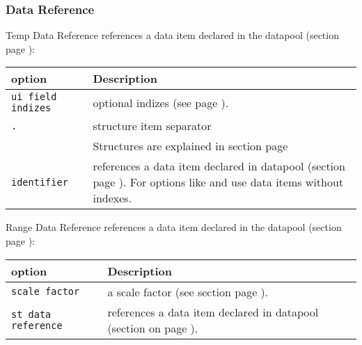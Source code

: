 \newpage
\subsubsection{Data Reference}
\label{sec:tempdatareference}
Temp Data Reference references a data item declared in the datapool 
(section  page \pageref{sec:dpitem}): \\



\begin{tabularx}{\textwidth}{l|X}
option            & Description \\
\hline
\verb+ui field indizes+ & optional indizes (see page \pageref{uifieldindizes}). \\
\verb+.+          & structure item separator \\
                  & Structures are explained in section \nameref{sec:dpstruct}
                  page \pageref{sec:dpstruct}\\
\verb+identifier+ & references a data item declared in datapool (section 
              \nameref{sec:dpitem} page \pageref{sec:dpitem}). For options like
              \LABEL{} and \UNIT{} use data items without indexes. \\
\end{tabularx}

\vspace{3cm}

\label{sec:rangedatareference}
Range Data Reference references a data item declared in the datapool
(section  page \pageref{sec:dpitem}): \\



\begin{tabularx}{\textwidth}{l|X}
option            & Description \\
\hline
\verb+scale factor+      & a scale factor (see section \nameref{sec:scale} page \pageref{sec:scale}). \\
\verb+st data reference+ & references a data item declared in datapool
                    (section \nameref{sec:stvariables} on page
                     \pageref{fig:st_data_reference}). \\
\end{tabularx}
